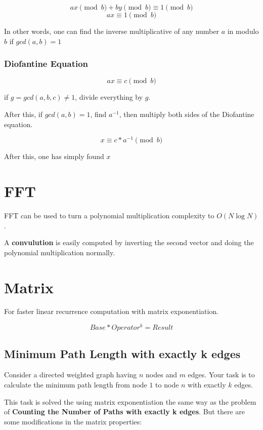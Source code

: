 	$$ ax \pmod{b} + by \pmod{b} \equiv 1 \pmod{b} $$
	$$ ax \equiv 1 \pmod{b} $$

	In other words, one can find the inverse multiplicative of any number $a$ in modulo $b$ if $gcd(a, b) = 1$

	\subsubsection{Diofantine Equation}

	$$ ax \equiv c \pmod{b} $$

	if $g = gcd({a, b, c}) \neq 1$, divide everything by $g$.

	After this, if $gcd(a, b) = 1$, find $a^{-1}$, then multiply both sides of the Diofantine equation.

	$$ x \equiv c * a^{-1} \pmod{b} $$

	After this, one has simply found $x$



\section{FFT}

	FFT can be used to turn a polynomial multiplication complexity to $O(N \log{N})$.

	A \textbf{convulution} is easily computed by inverting the second vector and doing the polynomial multiplication normally.


\section{Matrix}

For faster linear recurrence computation with matrix exponentiation. 

$$ Base * Operator^{k} = Result $$


\subsection{Minimum Path Length with exactly k edges}

Consider a directed weighted graph having $n$ nodes and $m$ edges.
Your task is to calculate the minimum path length from node $1$ to node $n$ with exactly $k$ edges.

This task is solved the using matrix exponentiation the 
same way as the problem of \textbf{Counting the Number of Paths with exactly k edges}.
But there are some modifications in the matrix properties: 

